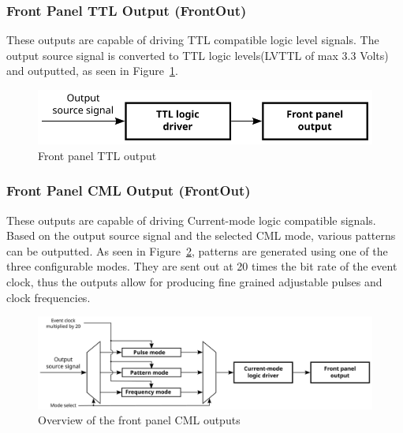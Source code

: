 \documentclass[12pt,a4paper]{article}
\begin{document}
\subsubsection{Front Panel TTL Output (FrontOut)}\label{sec:Front Panel TTL Output}
These outputs are capable of driving TTL compatible logic level signals. The output source signal is converted to TTL logic levels(LVTTL of max 3.3 Volts) and outputted, as seen in Figure~\ref{fig:output_ttl}.

\begin{figure}[H]
	\centering
	\includegraphics[]{./img/TTL}
	\caption{Front panel TTL output}
	\label{fig:output_ttl}
\end{figure}

\subsubsection{Front Panel CML Output (FrontOut)}\label{sec:Front Panel CML Output}
These outputs are capable of driving Current-mode logic compatible signals. Based on the output source signal and the selected CML mode, various patterns can be outputted. As seen in Figure~\ref{fig:output_cml}, patterns are generated using one of the three configurable modes. They are sent out at 20 times the bit rate of the event clock, thus the outputs allow for producing fine grained adjustable pulses and clock frequencies. 	
\begin{figure}[H]
	\centering
	\includegraphics[width=\columnwidth]{./img/CML}
	\caption{Overview of the front panel CML outputs}
	\label{fig:output_cml}
\end{figure}
\end{document}
